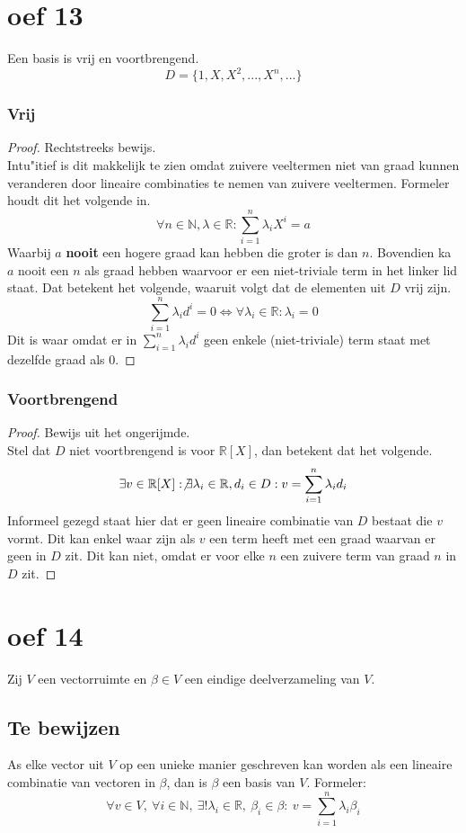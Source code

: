 \documentclass[lineaire_algebra_oplossingen.tex]{subfiles}
\begin{document}
\section{oef 13}
Een basis is vrij en voortbrengend.
\[
D = \{1,X,X^2,...,X^n,...\}
\]
\subsubsection*{Vrij}
\begin{proof}
Rechtstreeks bewijs.\\
Intu"itief is dit makkelijk te zien omdat zuivere veeltermen niet van graad kunnen veranderen door lineaire combinaties te nemen van zuivere veeltermen. Formeler houdt dit het volgende in.
\[
\forall n\in \mathbb{N},\lambda \in \mathbb{R}: \sum_{i=1}^n\lambda_iX^i = a
\] 
Waarbij $a$ \textbf{nooit} een hogere graad kan hebben die groter is dan $n$. Bovendien ka $a$ nooit een $n$ als graad hebben waarvoor er een niet-triviale term in het linker lid staat.
Dat betekent het volgende, waaruit volgt dat de elementen uit $D$ vrij zijn.
\[
\sum_{i=1}^n\lambda_id^i = 0 \Leftrightarrow \forall \lambda_i \in \mathbb{R}: \lambda_i =0
\]
Dit is waar omdat er in $\sum_{i=1}^n\lambda_id^i$ geen enkele (niet-triviale) term staat met dezelfde graad als $0$.
\end{proof}

\subsubsection*{Voortbrengend}
\begin{proof}
Bewijs uit het ongerijmde.\\
Stel dat $D$ niet voortbrengend is voor $\mathbb{R}[X]$, dan betekent dat het volgende.
\[
\exists v \in \mathbb{R}[X]: \not\exists \lambda_i\in \mathbb{R},d_i \in D: v = \sum_{i=1}^n\lambda_id_i
\]
Informeel gezegd staat hier dat er geen lineaire combinatie van $D$ bestaat die $v$ vormt.
Dit kan enkel waar zijn als $v$ een term heeft met een graad waarvan er geen in $D$ zit. Dit kan niet, omdat er voor elke $n$ een zuivere term van graad $n$ in $D$ zit.
\end{proof}

\section{oef 14}
Zij $V$ een vectorruimte en $\beta \in V$ een eindige deelverzameling van $V$.
\subsection*{Te bewijzen}
As elke vector uit $V$ op een unieke manier geschreven kan worden als een lineaire combinatie van vectoren in $\beta$, dan is $\beta$ een basis van $V$.
Formeler:
\[
\forall v \in V,\ \forall i\in \mathbb{N},\ \exists!\lambda_i\in \mathbb{R},\ \beta_i \in \beta:\ v=\sum_{i = 1}^n\lambda_i\beta_i
\]
\end{document}
